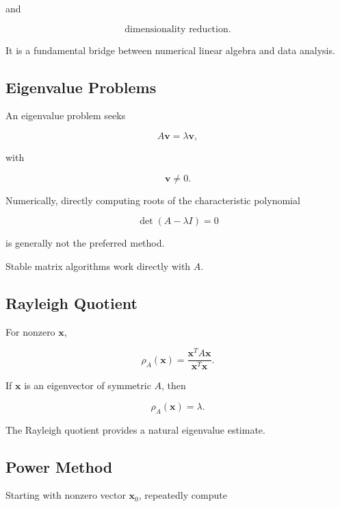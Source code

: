 and

\[
\boxed{
\text{dimensionality reduction}.
}
\]

It is a fundamental bridge between numerical linear algebra and data
analysis.

\subsection{Eigenvalue Problems}
\label{subsec:numerical-eigenvalue-problems}

An eigenvalue problem seeks

\[
\boxed{
A\mathbf{v}
=
\lambda\mathbf{v},
}
\]

with

\[
\mathbf{v}\neq0.
\]

Numerically, directly computing roots of the characteristic polynomial

\[
\det(A-\lambda I)=0
\]

is generally not the preferred method.

Stable matrix algorithms work directly with \(A\).

\subsection{Rayleigh Quotient}
\label{subsec:rayleigh-quotient}

For nonzero \(\mathbf{x}\),

\[
\boxed{
\rho_A(\mathbf{x})
=
\frac{
\mathbf{x}^TA\mathbf{x}
}{
\mathbf{x}^T\mathbf{x}
}.
}
\]

If \(\mathbf{x}\) is an eigenvector of symmetric \(A\), then

\[
\boxed{
\rho_A(\mathbf{x})
=
\lambda.
}
\]

The Rayleigh quotient provides a natural eigenvalue estimate.

\subsection{Power Method}
\label{subsec:power-method}

Starting with nonzero vector \(\mathbf{x}_0\), repeatedly compute

